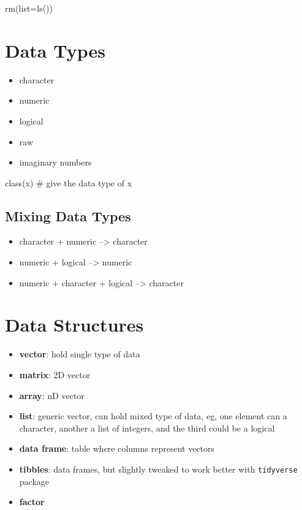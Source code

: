 \documentclass[
  letterpaper,
  DIV=11,
  numbers=noendperiod]{scrreprt}
\newenvironment{Shaded}{\begin{snugshade}}{\end{snugshade}}
\newcommand{\AttributeTok}[1]{\textcolor[rgb]{0.40,0.45,0.13}{#1}}
\newcommand{\CommentTok}[1]{\textcolor[rgb]{0.37,0.37,0.37}{#1}}
\newcommand{\FunctionTok}[1]{\textcolor[rgb]{0.28,0.35,0.67}{#1}}
\newcommand{\NormalTok}[1]{\textcolor[rgb]{0.00,0.23,0.31}{#1}}
\providecommand{\tightlist}{%
  \setlength{\itemsep}{0pt}\setlength{\parskip}{0pt}}\usepackage{longtable,booktabs,array}
\begin{document}
\begin{Shaded}
\begin{Highlighting}[]
\FunctionTok{rm}\NormalTok{(}\AttributeTok{list=}\FunctionTok{ls}\NormalTok{())}
\end{Highlighting}
\end{Shaded}

\section{Data Types}\label{data-types}

\begin{itemize}
\tightlist
\item
  character
\item
  numeric
\item
  logical
\item
  raw
\item
  imaginary numbers
\end{itemize}

\begin{Shaded}
\begin{Highlighting}[]
\FunctionTok{class}\NormalTok{(x)    }\CommentTok{\# give the data type of x}
\end{Highlighting}
\end{Shaded}

\subsection{Mixing Data Types}\label{mixing-data-types}

\begin{itemize}
\tightlist
\item
  character + numeric --\textgreater{} character
\item
  numeric + logical --\textgreater{} numeric
\item
  numeric + character + logical --\textgreater{} character
\end{itemize}

\section{Data Structures}\label{data-structures}

\begin{itemize}
\tightlist
\item
  \textbf{vector}: hold single type of data
\item
  \textbf{matrix}: 2D vector
\item
  \textbf{array}: nD vector
\item
  \textbf{list}: generic vector, can hold mixed type of data, eg, one
  element can a character, another a list of integers, and the third
  could be a logical
\item
  \textbf{data frame}: table where columns represent vectors
\item
  \textbf{tibbles}: data frames, but slightly tweaked to work better
  with \texttt{tidyverse} package
\item
  \textbf{factor}
\end{itemize}
\end{document}
